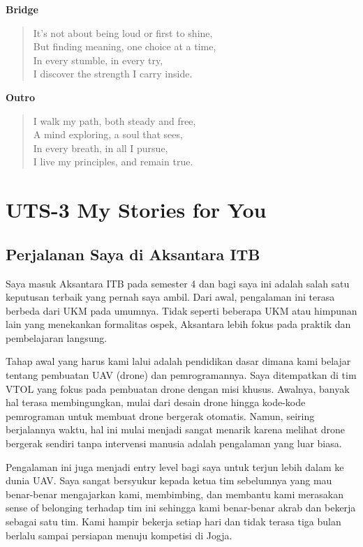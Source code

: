 \documentclass[
  letterpaper,
  DIV=11,
  numbers=noendperiod]{scrreprt}
\begin{document}
\textbf{Bridge}

\begin{quote}
It's not about being loud or first to shine,\\
But finding meaning, one choice at a time,\\
In every stumble, in every try,\\
I discover the strength I carry inside.
\end{quote}

\textbf{Outro}

\begin{quote}
I walk my path, both steady and free,\\
A mind exploring, a soul that sees,\\
In every breath, in all I pursue,\\
I live my principles, and remain true.
\end{quote}


\chapter{UTS-3 My Stories for You}\label{uts-3-my-stories-for-you}

\section{Perjalanan Saya di Aksantara
ITB}\label{perjalanan-saya-di-aksantara-itb}

Saya masuk Aksantara ITB pada semester 4 dan bagi saya ini adalah salah
satu keputusan terbaik yang pernah saya ambil. Dari awal, pengalaman ini
terasa berbeda dari UKM pada umumnya. Tidak seperti beberapa UKM atau
himpunan lain yang menekankan formalitas ospek, Aksantara lebih fokus
pada praktik dan pembelajaran langsung.

Tahap awal yang harus kami lalui adalah pendidikan dasar dimana kami
belajar tentang pembuatan UAV (drone) dan pemrogramannya. Saya
ditempatkan di tim VTOL yang fokus pada pembuatan drone dengan misi
khusus. Awalnya, banyak hal terasa membingungkan, mulai dari desain
drone hingga kode-kode pemrograman untuk membuat drone bergerak
otomatis. Namun, seiring berjalannya waktu, hal ini mulai menjadi sangat
menarik karena melihat drone bergerak sendiri tanpa intervensi manusia
adalah pengalaman yang luar biasa.

Pengalaman ini juga menjadi entry level bagi saya untuk terjun lebih
dalam ke dunia UAV. Saya sangat bersyukur kepada ketua tim sebelumnya
yang mau benar-benar mengajarkan kami, membimbing, dan membantu kami
merasakan sense of belonging terhadap tim ini sehingga kami benar-benar
akrab dan bekerja sebagai satu tim. Kami hampir bekerja setiap hari dan
tidak terasa tiga bulan berlalu sampai persiapan menuju kompetisi di
Jogja.
\end{document}
